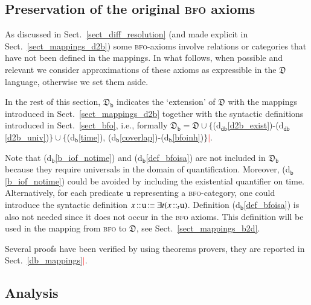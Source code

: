\documentclass[ao]{iosart2x}
\newcommand{\nb}[1]{\textcolor{red}{$|$}\marginpar{\hspace*{-0cm}\parbox{20mm}{\scriptsize\raggedright\textcolor{red}{#1}}}}
\newcommand{\bfoDefLabel}{\textrm{d$_\texttt{b}$}}
\newcommand{\dbDefLabel}{\textrm{d$_\texttt{db}$}}
\newcommand{\dbThrLabel}{\textrm{t$_\texttt{db}$}}
\newcommand{\refbfodf}[1]{({\bfoDefLabel}\ref{#1})}
\newcommand{\refdbdf}[1]{({\dbDefLabel}\ref{#1})}
\newcommand{\refdbth}[1]{({\dbThrLabel}\ref{#1})}
\newcommand{\cn}[1]{\mathtt{#1}}
\newcommand\textequal{%
 \rule[.08ex]{5pt}{0.35pt}\llap{\rule[.78ex]{5pt}{0.35pt}}}
\newcommand{\sdef}{{\hspace{1.5pt}:\hspace{-2.5pt}\textequal\hspace{3pt}}}
\newcommand{\bfo}{{\textsc{bfo}}}
\newcommand {\thdolce} {\ensuremath{\mathfrak{D}}}
\newcommand {\dbmap} {\ensuremath{\mathfrak{M}_\texttt{db}}}
\newcommand {\thdolcedbmap} {\ensuremath{\mathfrak{D}_\texttt{b}}}
\newcommand{\bfoiof}[1]{{\,::_{#1\:\!}}}
\begin{document}
\subsection{Preservation of the original {\bfo} axioms}\label{sect_check_bfo_preservation}

As discussed in Sect.~\ref{sect_diff_resolution} (and made explicit in Sect.~\ref{sect_mappings_d2b}) some {\bfo}-axioms involve relations or categories that have not been defined in the mappings. In what follows, when possible and relevant we consider approximations of these axioms as expressible in the $\thdolce$ language, otherwise we set them aside.

In the rest of this section, $\thdolcedbmap$ indicates the `extension' of $\thdolce$ with the mappings introduced in Sect.~\ref{sect_mappings_d2b} together with the syntactic definitions introduced in Sect.~\ref{sect_bfo}, i.e., formally $\thdolcedbmap = \thdolce \cup \{$\refdbdf{d2b_exist}-\refdbdf{d2b_univ}$\} \cup \{$\refbfodf{time}, \refbfodf{coverlap}-\refbfodf{bfoinh}$\}$\nb{FC. check references}.

Note that \refbfodf{b_iof_notime} and \refbfodf{def_bfoisa} are not included in $\thdolcedbmap$ because they require universals in the domain of quantification. Moreover, \refbfodf{b_iof_notime} could be avoided by including the existential quantifier on time. Alternatively, for each predicate $\cn{u}$ representing a {\bfo}-category, one could introduce the syntactic definition $x \bfoiof{} \cn{u} \sdef \exists t(x \bfoiof{t} \cn{u})$. Definition \refbfodf{def_bfoisa} is also not needed since it does not occur in the {\bfo} axioms. This definition will be used in the mapping from {\bfo} to $\thdolce$, see Sect.~\ref{sect_mappings_b2d}. 


Several proofs have been verified by using theorems provers, they are reported in Sect.~\ref{db_mappings}\nb{FC: frase da modificare}.

\subsection{Analysis}\label{sect_analysis_d2b}
\end{document}

